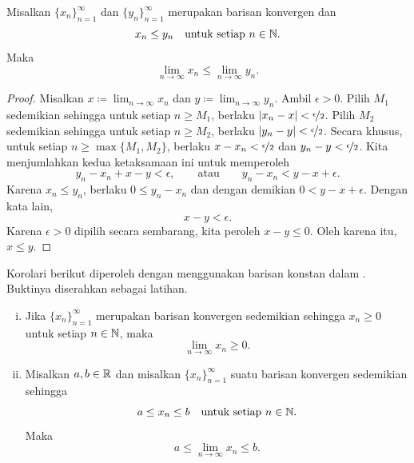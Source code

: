 \begin{lemma} \label{limandineq:lemma}
Misalkan $\{ x_n \}_{n=1}^\infty$ dan $\{ y_n \}_{n=1}^\infty$ merupakan
barisan konvergen dan
\begin{equation*}
x_n \leq y_n \quad \text{untuk setiap } n \in {\mathbb{N}} .
\end{equation*}
Maka
\begin{equation*}
\lim_{n\to\infty} x_n \leq
\lim_{n\to\infty} y_n .
\end{equation*}
\end{lemma}

\begin{proof}
Misalkan $x \coloneqq \lim_{n\to\infty} x_n$ dan $y \coloneqq \lim_{n\to\infty} y_n$. 
Ambil 
$\epsilon > 0$.  Pilih $M_1$ sedemikian sehingga untuk setiap $n \geq M_1$,
berlaku $\lvert {x_n-x} \rvert < \nicefrac{\epsilon}{2}$.  Pilih $M_2$ sedemikian sehingga
untuk setiap $n \geq M_2$, berlaku
$\lvert {y_n-y} \rvert < \nicefrac{\epsilon}{2}$.  Secara khusus,
untuk setiap $n \geq \max\{ M_1, M_2 \}$, berlaku
$x-x_n < \nicefrac{\epsilon}{2}$ dan
$y_n-y < \nicefrac{\epsilon}{2}$.  Kita menjumlahkan kedua ketaksamaan ini untuk
memperoleh
\begin{equation*}
y_n-x_n+x-y < \epsilon, \qquad \text{atau} \qquad
y_n-x_n < y-x+ \epsilon .
\end{equation*}
Karena $x_n \leq y_n$, berlaku
$0 \leq y_n-x_n$ dan dengan demikian $0 < y-x+ \epsilon$.
Dengan kata lain,
\begin{equation*}
x-y < \epsilon .
\end{equation*}
Karena $\epsilon > 0$ dipilih secara sembarang, kita peroleh
$x-y \leq 0$.
Oleh karena itu, $x \leq y$.
\end{proof}

Korolari berikut diperoleh dengan
menggunakan barisan konstan dalam
.  Buktinya diserahkan sebagai latihan.

\begin{samepage}
\begin{cor} \label{limandineq:cor}
\leavevmode
\begin{enumerate}[(i)]
\item Jika $\{ x_n \}_{n=1}^\infty$ merupakan barisan konvergen sedemikian sehingga $x_n \geq 0$ untuk setiap
$n \in {\mathbb{N}}$,
maka
\begin{equation*}
\lim_{n\to\infty} x_n \geq 0.
\end{equation*}
\item
Misalkan $a,b \in {\mathbb{R}}$ dan
misalkan $\{ x_n \}_{n=1}^\infty$ suatu barisan konvergen sedemikian sehingga
\begin{equation*}
a \leq x_n \leq b \quad \text{untuk setiap } n \in {\mathbb{N}} .
\end{equation*}
Maka
\begin{equation*}
a \leq \lim_{n\to\infty} x_n \leq b.
\end{equation*}
\end{enumerate}
\end{cor}
\end{samepage}

